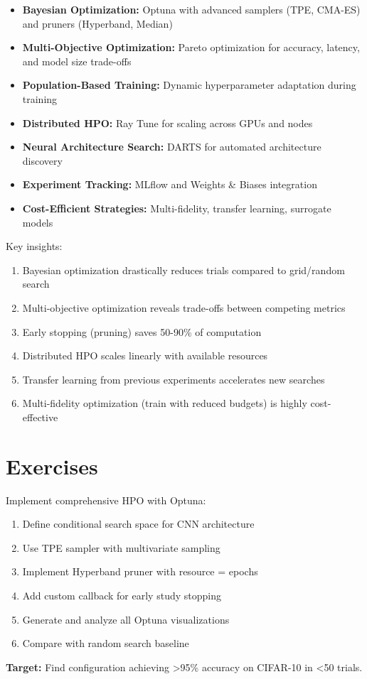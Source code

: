 \begin{itemize}
    \item \textbf{Bayesian Optimization:} Optuna with advanced samplers (TPE, CMA-ES) and pruners (Hyperband, Median)
    \item \textbf{Multi-Objective Optimization:} Pareto optimization for accuracy, latency, and model size trade-offs
    \item \textbf{Population-Based Training:} Dynamic hyperparameter adaptation during training
    \item \textbf{Distributed HPO:} Ray Tune for scaling across GPUs and nodes
    \item \textbf{Neural Architecture Search:} DARTS for automated architecture discovery
    \item \textbf{Experiment Tracking:} MLflow and Weights \& Biases integration
    \item \textbf{Cost-Efficient Strategies:} Multi-fidelity, transfer learning, surrogate models
\end{itemize}

Key insights:
\begin{enumerate}
    \item Bayesian optimization drastically reduces trials compared to grid/random search
    \item Multi-objective optimization reveals trade-offs between competing metrics
    \item Early stopping (pruning) saves 50-90\% of computation
    \item Distributed HPO scales linearly with available resources
    \item Transfer learning from previous experiments accelerates new searches
    \item Multi-fidelity optimization (train with reduced budgets) is highly cost-effective
\end{enumerate}

\section{Exercises}

\begin{exercise}
Implement comprehensive HPO with Optuna:
\begin{enumerate}
    \item Define conditional search space for CNN architecture
    \item Use TPE sampler with multivariate sampling
    \item Implement Hyperband pruner with resource = epochs
    \item Add custom callback for early study stopping
    \item Generate and analyze all Optuna visualizations
    \item Compare with random search baseline
\end{enumerate}
\textbf{Target:} Find configuration achieving >95\% accuracy on CIFAR-10 in <50 trials.
\end{exercise}

